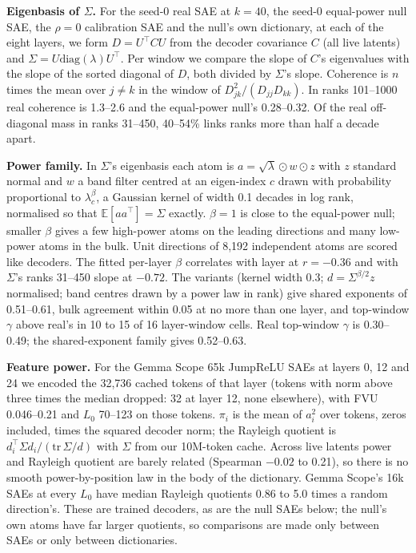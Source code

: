 \documentclass[10pt,twocolumn]{article}
\newcommand{\Sig}{\Sigma}
\newcommand{\Lz}{L_0}
\begin{document}
\textbf{Eigenbasis of $\Sig$.} For the seed-0 real SAE at $k=40$, the seed-0 equal-power null SAE, the $\rho=0$ calibration SAE and the null's own dictionary, at each of the eight layers, we form $D=U^\top C U$ from the decoder covariance $C$ (all live latents) and $\Sig = U \mathrm{diag}(\lambda) U^\top$. Per window we compare the slope of $C$'s eigenvalues with the slope of the sorted diagonal of $D$, both divided by $\Sig$'s slope. Coherence is $n$ times the mean over $j \ne k$ in the window of $D_{jk}^2/(D_{jj}D_{kk})$. In ranks 101--1000 real coherence is 1.3--2.6 and the equal-power null's 0.28--0.32. Of the real off-diagonal mass in ranks 31--450, 40--54\% links ranks more than half a decade apart.

\textbf{Power family.} In $\Sig$'s eigenbasis each atom is $a = \sqrt{\lambda} \odot w \odot z$ with $z$ standard normal and $w$ a band filter centred at an eigen-index $c$ drawn with probability proportional to $\lambda_c^{\beta}$, a Gaussian kernel of width 0.1 decades in log rank, normalised so that $\mathbb{E}[aa^\top]=\Sig$ exactly. $\beta=1$ is close to the equal-power null; smaller $\beta$ gives a few high-power atoms on the leading directions and many low-power atoms in the bulk. Unit directions of 8,192 independent atoms are scored like decoders. The fitted per-layer $\beta$ correlates with layer at $r=-0.36$ and with $\Sig$'s ranks 31--450 slope at $-0.72$. The variants (kernel width 0.3; $d=\Sig^{\beta/2}z$ normalised; band centres drawn by a power law in rank) give shared exponents of 0.51--0.61, bulk agreement within 0.05 at no more than one layer, and top-window $\gamma$ above real's in 10 to 15 of 16 layer-window cells. Real top-window $\gamma$ is 0.30--0.49; the shared-exponent family gives 0.52--0.63.

\textbf{Feature power.} For the Gemma Scope 65k JumpReLU SAEs at layers 0, 12 and 24 we encoded the 32,736 cached tokens of that layer (tokens with norm above three times the median dropped: 32 at layer 12, none elsewhere), with FVU 0.046--0.21 and $\Lz$ 70--123 on those tokens. $\pi_i$ is the mean of $a_i^2$ over tokens, zeros included, times the squared decoder norm; the Rayleigh quotient is $d_i^\top \Sig d_i / (\mathrm{tr}\,\Sig/d)$ with $\Sig$ from our 10M-token cache. Across live latents power and Rayleigh quotient are barely related (Spearman $-0.02$ to 0.21), so there is no smooth power-by-position law in the body of the dictionary. Gemma Scope's 16k SAEs at every $\Lz$ have median Rayleigh quotients 0.86 to 5.0 times a random direction's. These are trained decoders, as are the null SAEs below; the null's own atoms have far larger quotients, so comparisons are made only between SAEs or only between dictionaries.
\end{document}
